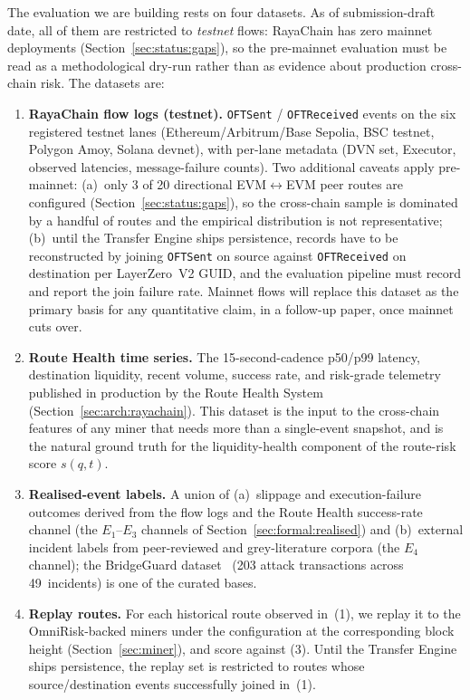 \documentclass[11pt,a4paper]{article}
\begin{document}
The evaluation we are building rests on four datasets. As of submission-draft date,
all of them are restricted to \emph{testnet} flows: RayaChain has zero mainnet
deployments (Section~\ref{sec:status:gaps}), so the pre-mainnet evaluation must be
read as a methodological dry-run rather than as evidence about production cross-chain
risk. The datasets are:
\begin{enumerate}
  \item \textbf{RayaChain flow logs (testnet).} \texttt{OFTSent} /
        \texttt{OFTReceived} events on the six registered testnet lanes
        (Ethereum/Arbitrum/Base Sepolia, BSC testnet, Polygon Amoy, Solana
        devnet), with per-lane metadata (DVN set, Executor, observed latencies,
        message-failure counts). Two additional caveats apply pre-mainnet:
        (a)~only 3 of 20 directional EVM$\leftrightarrow$EVM peer routes are
        configured (Section~\ref{sec:status:gaps}), so the cross-chain sample
        is dominated by a handful of routes and the empirical distribution is
        not representative; (b)~until the Transfer Engine ships persistence,
        records have to be reconstructed by joining \texttt{OFTSent} on source
        against \texttt{OFTReceived} on destination per LayerZero~V2 GUID,
        and the evaluation pipeline must record and report the join failure
        rate. Mainnet flows will replace this dataset as the primary basis
        for any quantitative claim, in a follow-up paper, once mainnet cuts
        over.
  \item \textbf{Route Health time series.} The 15-second-cadence p50/p99 latency,
        destination liquidity, recent volume, success rate, and risk-grade telemetry
        published in production by the Route Health System
        (Section~\ref{sec:arch:rayachain}). This dataset is the input to the
        cross-chain features of any miner that needs more than a single-event
        snapshot, and is the natural ground truth for the liquidity-health
        component of the route-risk score $s(q,t)$.
  \item \textbf{Realised-event labels.} A union of (a)~slippage and
        execution-failure outcomes derived from the flow logs and the Route Health
        success-rate channel (the $E_1$--$E_3$ channels of
        Section~\ref{sec:formal:realised}) and (b)~external incident labels from
        peer-reviewed and grey-literature corpora (the $E_4$ channel); the
        BridgeGuard dataset~\cite{wu2025safeguarding} (203 attack transactions
        across 49~incidents) is one of the curated bases.
  \item \textbf{Replay routes.} For each historical route observed in~(1), we
        replay it to the OmniRisk-backed miners under the configuration at the
        corresponding block height (Section~\ref{sec:miner}), and score against
        (3). Until the Transfer Engine ships persistence, the replay set is
        restricted to routes whose source/destination events successfully joined
        in~(1).
\end{enumerate}
\end{document}

